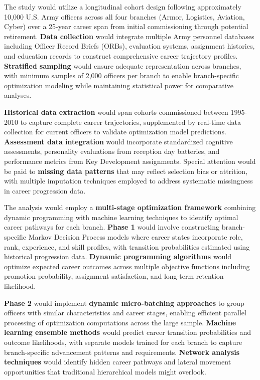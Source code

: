 \documentclass[main.tex]{subfiles}
\begin{document}

The study would utilize a longitudinal cohort design following approximately 10,000 U.S. Army officers across all four branches (Armor, Logistics, Aviation, Cyber) over a 25-year career span from initial commissioning through potential retirement\parencite{army_indicators}. \textbf{Data collection} would integrate multiple Army personnel databases including Officer Record Briefs (ORBs), evaluation systems, assignment histories, and education records to construct comprehensive career trajectory profiles. \textbf{Stratified sampling} would ensure adequate representation across branches, with minimum samples of 2,000 officers per branch to enable branch-specific optimization modeling while maintaining statistical power for comparative analyses\parencite{career_optimization}.

\textbf{Historical data extraction} would span cohorts commissioned between 1995-2010 to capture complete career trajectories, supplemented by real-time data collection for current officers to validate optimization model predictions\parencite{succession_pipelines}. \textbf{Assessment data integration} would incorporate standardized cognitive assessments, personality evaluations from reception day batteries, and performance metrics from Key Development assignments\parencite{army_indicators}. Special attention would be paid to \textbf{missing data patterns} that may reflect selection bias or attrition, with multiple imputation techniques employed to address systematic missingness in career progression data\parencite{career_optimization}.


The analysis would employ a \textbf{multi-stage optimization framework} combining dynamic programming with machine learning techniques to identify optimal career pathways for each branch\parencite{dynapipe_eurosys,jobcomposer}. \textbf{Phase 1} would involve constructing branch-specific Markov Decision Process models where career states incorporate role, rank, experience, and skill profiles, with transition probabilities estimated using historical progression data\parencite{trajectory_dp,dynamic_programming}. \textbf{Dynamic programming algorithms} would optimize expected career outcomes across multiple objective functions including promotion probability, assignment satisfaction, and long-term retention likelihood\parencite{jobcomposer}.

\textbf{Phase 2} would implement \textbf{dynamic micro-batching approaches} to group officers with similar characteristics and career stages, enabling efficient parallel processing of optimization computations across the large sample\parencite{dynapipe_eurosys}. \textbf{Machine learning ensemble methods} would predict career transition probabilities and outcome likelihoods, with separate models trained for each branch to capture branch-specific advancement patterns and requirements\parencite{career_optimization}. \textbf{Network analysis techniques} would identify hidden career pathways and lateral movement opportunities that traditional hierarchical models might overlook\parencite{career_optimization}.
\end{document}

